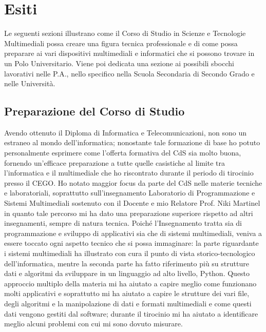 \setcounter{chapter}{5}
\setcounter{section}{0}

\chapter{Esiti}
    Le seguenti sezioni illustrano come il Corso di Studio in Scienze e Tecnologie Multimediali possa creare una figura tecnica professionale e di come possa preparare ai vari dispositivi multimediali e informatici che si possono trovare in un Polo Universitario. \newline
    Viene poi dedicata una sezione ai possibili sbocchi lavorativi nelle P.A., nello specifico nella Scuola Secondaria di Secondo Grado e nelle Università. 
    \section{Preparazione del Corso di Studio}
        Avendo ottenuto il Diploma di Informatica e Telecomunicazioni, non sono un estraneo al mondo dell'informatica; nonostante tale formazione di base ho potuto personalmente esprimere come l'offerta formativa del CdS sia molto buona, fornendo un'efficace preparazione a tutte quelle casistiche al limite tra l'informatica e il multimediale che ho riscontrato durante il periodo di tirocinio presso il CEGO. \newline 
        Ho notato maggior focus da parte del CdS nelle materie tecniche e laboratoriali, soprattutto sull'insegnamento Laboratorio di Programmazione e Sistemi Multimediali sostenuto con il Docente e mio Relatore Prof. Niki Martinel in quanto tale percorso mi ha dato una preparazione superiore rispetto ad altri insegnamenti, sempre di natura tecnica. \newline
        Poiché l'Insegnamento tratta sia di programmazione e sviluppo di applicativi sia che di sistemi multimediali, veniva a essere toccato ogni aspetto tecnico che si possa immaginare: la parte riguardante i sistemi multimediali ha illustrato con cura il punto di vista storico-tecnologico dell'informatica, mentre la seconda parte ha fatto riferimento  più su strutture dati e algoritmi da sviluppare in un linguaggio ad alto livello, Python. Questo approccio multiplo della materia mi ha aiutato a capire meglio come funzionano molti applicativi e soprattutto mi ha aiutato a capire le strutture dei vari file, degli algoritmi e la manipolazione di dati e formati multimediali e come questi dati vengono gestiti dal software; durante il tirocinio mi ha aiutato a identificare meglio alcuni problemi con cui mi sono dovuto misurare. \newline

